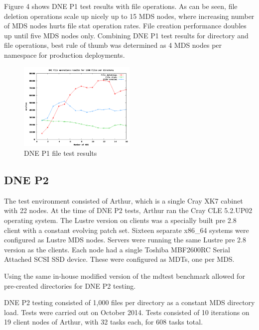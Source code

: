 \documentclass[conference,compsoc]{IEEEtran}
\begin{document}
Figure 4 shows DNE P1 test results with file operations. As can be seen,
file deletion operations scale up nicely up to 15 MDS nodes, where increasing
number of MDS nodes hurts file stat operation rates. File creation performance
doubles up until five MDS nodes only.  Combining DNE P1 test results for
directory and file operations, best rule of thumb was determined as 4 MDS nodes
per namespace for production deployments.


\begin{figure}[!ht]
  \centering
    \includegraphics[width=0.5\textwidth]{figs/dnep1_file_results}
  \caption{DNE P1 file test results}
\end{figure}
 


\subsection{DNE P2}

The test environment consisted of Arthur, which is a single Cray XK7 cabinet with
22 nodes. At the time of DNE P2 tests, Arthur ran the Cray CLE 5.2.UP02
operating system. The Lustre version on clients was a specially built pre 2.8
client with a constant evolving patch set. Sixteen separate x86\_64 systems were
configured as Lustre MDS nodes. Servers were running the same Lustre pre 2.8
version as the clients. Each node had a single Toshiba MBF2600RC Serial
Attached SCSI SSD device. These were configured as MDTs, one per MDS. 

Using the same in-house modified version of the mdtest benchmark allowed for
pre-created directories for DNE P2 testing.


DNE P2 testing consisted of 1,000 files per directory as a constant MDS
directory load. Tests were carried out on October 2014. Tests consisted of 10
iterations on 19 client nodes of Arthur, with 32 tasks each, for 608 tasks total.
\end{document}

